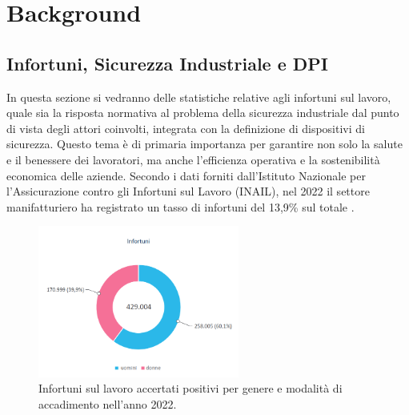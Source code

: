 \chapter{Background}

\section{Infortuni, Sicurezza Industriale e DPI}


In questa sezione si vedranno delle statistiche relative agli infortuni sul lavoro, quale sia la risposta normativa al problema della sicurezza industriale dal punto di vista degli attori coinvolti, integrata con la definizione di dispositivi di sicurezza. Questo tema è di primaria importanza per garantire non solo la salute e il benessere dei lavoratori, ma anche l'efficienza operativa e la sostenibilità economica delle aziende. Secondo i dati forniti dall'Istituto Nazionale per l'Assicurazione contro gli Infortuni sul Lavoro (INAIL), nel 2022 il settore manifatturiero ha registrato un tasso di infortuni del 13,9\% sul totale \cite{inail2023}.

\begin{figure}[htbp]
    \centering
    \includegraphics[width=0.59\textwidth]{figures/totaleinfortuni.png}
    \caption{Infortuni sul lavoro accertati positivi per genere
e modalità di accadimento nell'anno 2022.}
    \label{fig:infortot}
\end{figure}


